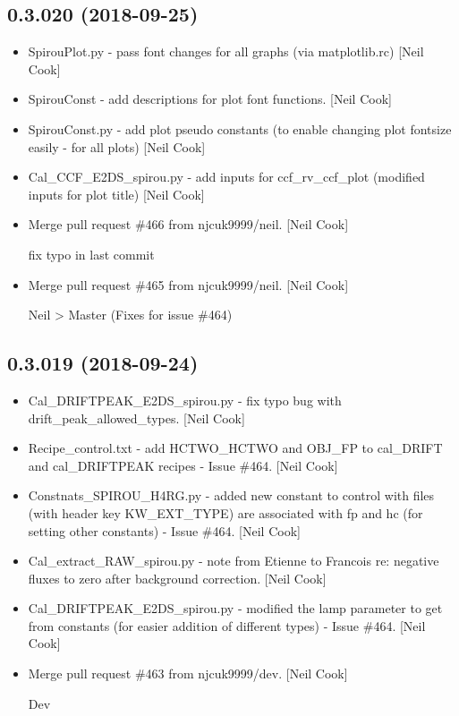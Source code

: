 \documentclass[a4paper,10pt,english]{report}
\begin{document}
\subsection{0.3.020 (2018-09-25)}
\label{\detokenize{misc/changelog:id310}}\begin{itemize}
\item {} 
SpirouPlot.py - pass font changes for all graphs (via matplotlib.rc)
{[}Neil Cook{]}

\item {} 
SpirouConst - add descriptions for plot font functions. {[}Neil Cook{]}

\item {} 
SpirouConst.py - add plot pseudo constants (to enable changing plot
fontsize easily - for all plots) {[}Neil Cook{]}

\item {} 
Cal\_CCF\_E2DS\_spirou.py - add inputs for ccf\_rv\_ccf\_plot (modified
inputs for plot title) {[}Neil Cook{]}

\item {} 
Merge pull request \#466 from njcuk9999/neil. {[}Neil Cook{]}

fix typo in last commit

\item {} 
Merge pull request \#465 from njcuk9999/neil. {[}Neil Cook{]}

Neil \textendash{}\textgreater{} Master (Fixes for issue \#464)

\end{itemize}


\subsection{0.3.019 (2018-09-24)}
\label{\detokenize{misc/changelog:id311}}\begin{itemize}
\item {} 
Cal\_DRIFTPEAK\_E2DS\_spirou.py - fix typo bug with
drift\_peak\_allowed\_types. {[}Neil Cook{]}

\item {} 
Recipe\_control.txt - add HCTWO\_HCTWO and OBJ\_FP to cal\_DRIFT and
cal\_DRIFTPEAK recipes - Issue \#464. {[}Neil Cook{]}

\item {} 
Constnats\_SPIROU\_H4RG.py - added new constant to control with files
(with header key KW\_EXT\_TYPE) are associated with fp and hc (for
setting other constants) - Issue \#464. {[}Neil Cook{]}

\item {} 
Cal\_extract\_RAW\_spirou.py - note from Etienne to Francois re: negative
fluxes to zero after background correction. {[}Neil Cook{]}

\item {} 
Cal\_DRIFTPEAK\_E2DS\_spirou.py - modified the lamp parameter to get from
constants (for easier addition of different types) - Issue \#464. {[}Neil
Cook{]}

\item {} 
Merge pull request \#463 from njcuk9999/dev. {[}Neil Cook{]}

Dev

\end{itemize}
\end{document}
